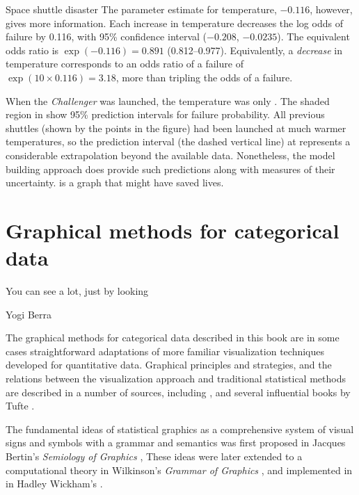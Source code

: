 \documentclass[11pt]{book}\usepackage[]{graphicx}\usepackage[]{color}
\begin{document}
\begin{Example}[nasa0]{Space shuttle disaster}
The parameter estimate for temperature, $-0.116$, however, gives more information.  Each  increase in temperature decreases the log odds
of failure by 0.116, with 95\% confidence interval ($-0.208$, $-0.0235$).  The equivalent odds ratio is $\exp(-0.116) = 0.891$ (0.812--0.977).
Equivalently, a  \emph{decrease} in temperature corresponds to
an odds ratio of a failure of 
$\exp(10 \times 0.116) = 3.18$, more than tripling the odds of a failure.

When the \emph{Challenger} was launched, the temperature was only .
The shaded region in  show 95\% prediction intervals
for failure probability.  All previous shuttles (shown by the points
in the figure) had been launched at much warmer temperatures, so the
prediction interval (the dashed vertical line)
at  represents a considerable extrapolation
beyond the available data.  Nonetheless, the model building approach
does provide such predictions along with measures of their uncertainty.
 is a graph
that might have saved lives.

\end{Example}


\section{Graphical methods for categorical data}\label{sec:methods}

\epigraph{You can see a lot, just by looking}{Yogi Berra}

The graphical methods for categorical data described in this book
are in some cases straightforward adaptations of more familiar
visualization techniques developed for quantitative data.
Graphical principles and strategies, and the relations between
the visualization approach and traditional statistical methods
are described in a number of sources, including
\citet{Chambers-etal:83},
\citet{Cleveland:VisData} and several influential books by Tufte
\citep{Tufte:83,Tufte:90,Tufte:97,Tufte:2006}.

The fundamental ideas of statistical graphics as a comprehensive system
of visual signs and symbols with a grammar and semantics was first proposed
in Jacques Bertin's \emph{Semiology of Graphics} \citeyearpar{Bertin:83}, 
These ideas were later extended to a computational theory
in Wilkinson's \emph{Grammar of Graphics} \citeyearpar{Wilkinson:2005},
and implemented in \R in Hadley Wickham's 
\citep{Wickham:2009:ggplot2,ggplot2}.
\end{document}

